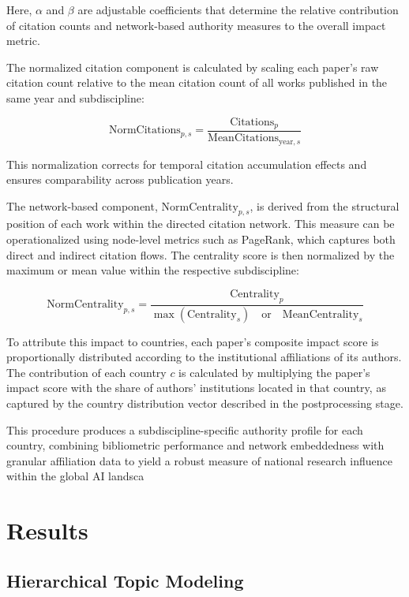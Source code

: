 \documentclass{article}
\begin{document}
Here, \(\alpha\) and \(\beta\) are adjustable coefficients that determine the relative contribution of citation counts and network-based authority measures to the overall impact metric.

The normalized citation component is calculated by scaling each paper’s raw citation count relative to the mean citation count of all works published in the same year and subdiscipline:

\begin{equation}
	\text{NormCitations}_{p,s} = 
	\frac{
		\text{Citations}_{p}
	}{
		\text{MeanCitations}_{\text{year},s}
	}
\end{equation}

This normalization corrects for temporal citation accumulation effects and ensures comparability across publication years.

The network-based component, \(\text{NormCentrality}_{p,s}\), is derived from the structural position of each work within the directed citation network. This measure can be operationalized using node-level metrics such as PageRank, which captures both direct and indirect citation flows. The centrality score is then normalized by the maximum or mean value within the respective subdiscipline:

\begin{equation}
	\text{NormCentrality}_{p,s} = 
	\frac{
		\text{Centrality}_{p}
	}{
		\max(\text{Centrality}_{s}) 
		\quad \text{or} \quad
		\text{MeanCentrality}_{s}
	}
\end{equation}

To attribute this impact to countries, each paper’s composite impact score is proportionally distributed according to the institutional affiliations of its authors. The contribution of each country \( c \) is calculated by multiplying the paper’s impact score with the share of authors’ institutions located in that country, as captured by the country distribution vector described in the postprocessing stage.

This procedure produces a subdiscipline-specific authority profile for each country, combining bibliometric performance and network embeddedness with granular affiliation data to yield a robust measure of national research influence within the global AI landsca

\section{Results}

\subsection{Hierarchical Topic Modeling}
\end{document}
